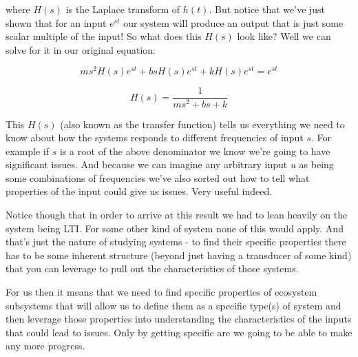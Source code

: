 \documentclass[11pt,a5paper]{article}
\begin{document}
 where $H(s)$ is the Laplace transform of $h(t)$. But notice that we've just shown that for an input $e^{st}$ our system will produce an output that is just some scalar multiple of the input! So what does this $H(s)$ look like? Well we can solve for it in our original equation:
 
 $$ms^2H(s)e^{st}+bsH(s)e^{st}+kH(s)e^{st}=e^{st}$$
 
 $$H(s) = \frac{1}{ms^2+bs+k}$$
 
This $H(s)$ (also known as the transfer function) tells us everything we need to know about how the systems responds to different frequencies of input $s$. For example if $s$ is a root of the above denominator we know we're going to have significant issues. And because we can imagine any arbitrary input $u$ as being some combinations of frequencies we've also sorted out how to tell what properties of the input could give us issues. Very useful indeed.\newline


Notice though that in order to arrive at this result we had to lean heavily on the system being LTI. For some other kind of system none of this would apply. And that's just the nature of studying systems - to find their specific properties there has to be some inherent structure (beyond just having a transducer of some kind) that you can leverage to pull out the characteristics of those systems. \newline

For us then it means that we need to find specific properties of ecosystem subsystems that will allow us to define them as a specific type(s) of system and then leverage those properties into understanding the characteristics of the inputs that could lead to issues. Only by getting specific are we going to be able to make any more progress. 

\newpage



\end{document}
